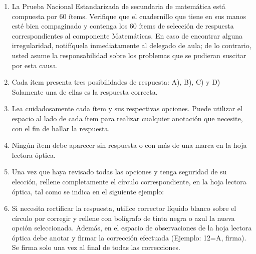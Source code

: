 \documentclass[12pt]{article}
\begin{document}
\begin{enumerate}[leftmargin=*, itemsep=3pt, topsep=2pt, parsep=0pt]
  \item La Prueba Nacional Estandarizada de secundaria de matem\'atica est\'a compuesta por 60 \'items. Verifique que el cuadernillo que tiene en sus manos est\'e bien compaginado y contenga los 60 \'items de selecci\'on de respuesta correspondientes al componente Matem\'aticas. En caso de encontrar alguna irregularidad, notif\'iquela inmediatamente al delegado de aula; de lo contrario, usted asume la responsabilidad sobre los problemas que se pudieran suscitar por esta causa.

  \item Cada \'item presenta tres posibilidades de respuesta: A), B), C) y D) Solamente una de ellas es la respuesta correcta.

  \item Lea cuidadosamente cada \'item y sus respectivas opciones. Puede utilizar el espacio al lado de cada \'item para realizar cualquier anotaci\'on que necesite, con el fin de hallar la respuesta.

  \item Ning\'un \'item debe aparecer sin respuesta o con m\'as de una marca en la hoja lectora \'optica.

  \item Una vez que haya revisado todas las opciones y tenga seguridad de su elecci\'on, rellene completamente el c\'irculo correspondiente, en la hoja lectora \'optica, tal como se indica en el siguiente ejemplo:

  \begin{center}
  \end{center}

  \item Si necesita rectificar la respuesta, utilice corrector l\'iquido blanco sobre el c\'irculo por corregir y rellene con bol\'igrafo de tinta negra o azul la nueva opci\'on seleccionada. Adem\'as, en el espacio de observaciones de la hoja lectora \'optica debe anotar y firmar la correcci\'on efectuada (Ejemplo: 12=A, firma). Se firma solo una vez al final de todas las correcciones.
\end{enumerate}
\end{document}
